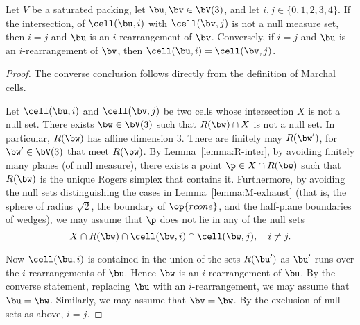 \begin{lemma}\label{lemma:marchal-equal}
Let $V$ be a saturated packing, 
let $\bu,\bv\in \bV(3)$, and let $i,j\in \{0,1,2,3,4\}$.
If the intersection, of
$\cell(\bu,i)$ with $\cell(\bv,j)$ is not a null measure set,
then $i=j$ and $\bu$ is an $i$-rearrangement of $\bv$.
Conversely, if $i=j$ and $\bu$ is an $i$-rearrangement of $\bv$, 
then $\cell(\bu,i)=\cell(\bv,j)$.
\end{lemma}

\begin{proof} 
The converse conclusion follows directly from the definition of Marchal cells.

Let $\cell(\bu,i)$ and $\cell(\bv,j)$ be two cells whose intersection $X$ is
not a null set.  There exists $\bw\in \bV(3)$ such that $R(\bw)\cap X$
is not a null set.  In particular, $R(\bw)$ has affine dimension $3$.  There are finitely
may $R(\bw')$, for $\bw'\in \bV(3)$ that meet $R(\bw)$.  
By Lemma~\ref{lemma:R-inter}, by avoiding finitely many planes (of null measure),
there exists a point $\p\in X\cap R(\bw)$ such that $R(\bw)$ is the unique
Rogers simplex that contains it.  Furthermore, by avoiding the null sets distinguishing
the cases in Lemma~\ref{lemma:M-exhaust} (that is, the sphere of radius $\sqrt2$,
the boundary of $\op{rcone}$, and the half-plane boundaries of wedges), we
may assume that $\p$ does not lie in any of the null sets
\begin{displaymath}
X\cap R(\bw)\cap\cell(\bw,i)\cap \cell(\bw,j),\quad i\ne j.
\end{displaymath} 


Now $\cell(\bu,i)$ is contained in the union of the sets $R(\bu')$ as $\bu'$ runs over the
$i$-rearrangements of $\bu$.  Hence $\bw$ is an $i$-rearrangement of
$\bu$.  By the converse statement, replacing $\bu$ with an
$i$-rearrangement, we may assume that $\bu=\bw$.  Similarly, we may
assume that $\bv=\bw$.  By the exclusion of null sets as above, $i=j$.
\end{proof}

